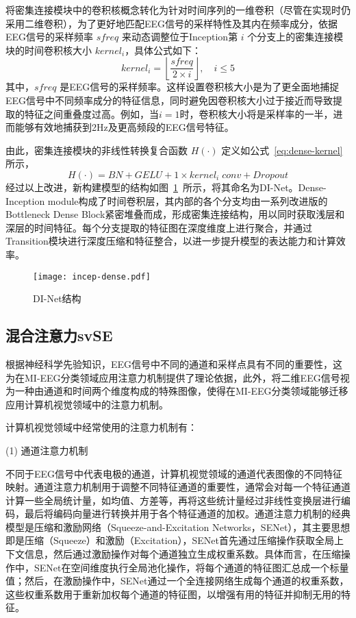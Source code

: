 将密集连接模块中的卷积核概念转化为针对时间序列的一维卷积（尽管在实现时仍采用二维卷积），为了更好地匹配EEG信号的采样特性及其内在频率成分，依据EEG信号的采样频率 \(sfreq\) 来动态调整位于Inception第 \(i\) 个分支上的密集连接模块的时间卷积核大小 \(kernel_i\)，具体公式如下：
\begin{equation}
    kernel_i = \left \lfloor \frac{sfreq}{2 \times i} \right \rfloor , \quad i \le 5
    \label{eq:kernel_cal}
\end{equation}
其中，\(sfreq\) 是EEG信号的采样频率。这样设置卷积核大小是为了更全面地捕捉EEG信号中不同频率成分的特征信息，同时避免因卷积核大小过于接近而导致提取的特征之间重叠度过高。例如，当\(i=1\)时，卷积核大小将是采样率的一半，进而能够有效地捕获到2Hz及更高频段的EEG信号特征。

由此，密集连接模块的非线性转换复合函数 \(H(·)\) 定义如公式~\ref{eq:dense-kernel}所示，
\begin{equation}\label{eq:dense-kernel}
    H(·) = BN + GELU + 1 \times kernel_i\;conv + Dropout 
\end{equation}
经过以上改进，新构建模型的结构如图~\ref{fig:incep-dense}~所示，将其命名为DI-Net。Dense-Inception module构成了时间卷积层，其内部的各个分支均由一系列改进版的Bottleneck Dense Block紧密堆叠而成，形成密集连接结构，用以同时获取浅层和深层的时间特征。每个分支提取的特征图在深度维度上进行聚合，并通过Transition模块进行深度压缩和特征整合，以进一步提升模型的表达能力和计算效率。
\begin{figure}
  \centering
  \texttt{[image: incep-dense.pdf]}
  \caption{DI-Net结构}
  \label{fig:incep-dense}
\end{figure}

\subsection{混合注意力svSE}

根据神经科学先验知识，EEG信号中不同的通道和采样点具有不同的重要性，这为在MI-EEG分类领域应用注意力机制提供了理论依据，此外，将二维EEG信号视为一种由通道和时间两个维度构成的特殊图像，使得在MI-EEG分类领域能够迁移应用计算机视觉领域中的注意力机制。

计算机视觉领域中经常使用的注意力机制有：

(1) 通道注意力机制
    
不同于EEG信号中代表电极的通道，计算机视觉领域的通道代表图像的不同特征映射。通道注意力机制用于调整不同特征通道的重要性，通常会对每一个特征通道计算一些全局统计量，如均值、方差等，再将这些统计量经过非线性变换层进行编码，最后将编码向量进行转换并用于各个特征通道的加权。通道注意力机制的经典模型是压缩和激励网络（Squeeze-and-Excitation Networks，SENet）\cite{8578843}，其主要思想即是压缩（Squeeze）和激励（Excitation），SENet首先通过压缩操作获取全局上下文信息，然后通过激励操作对每个通道独立生成权重系数。具体而言，在压缩操作中，SENet在空间维度执行全局池化操作，将每个通道的特征图汇总成一个标量值；然后，在激励操作中，SENet通过一个全连接网络生成每个通道的权重系数，这些权重系数用于重新加权每个通道的特征图，以增强有用的特征并抑制无用的特征。

